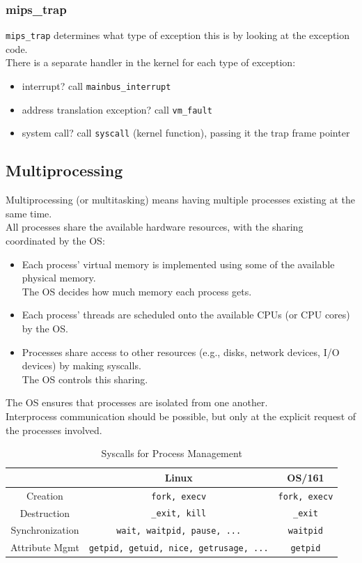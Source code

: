 \documentclass[12pt]{article}
\theoremstyle{plain}
\theoremstyle{definition}
\begin{document}
\subsubsection{mips\_trap}
\texttt{mips\_trap} determines what type of exception this is by looking at the exception code. \\
There is a separate handler in the kernel for each type of exception:
\begin{itemize}
  \item interrupt? call \texttt{mainbus\_interrupt}
  \item address translation exception? call \texttt{vm\_fault}
  \item system call? call \texttt{syscall} (kernel function), passing it the trap frame pointer
\end{itemize}

\subsection{Multiprocessing}
Multiprocessing (or multitasking) means having multiple processes existing at the same time. \\

All processes share the available hardware resources, with the sharing coordinated by the OS:
\begin{itemize}
  \item Each process' virtual memory is implemented using some of the available physical memory. \\
  The OS decides how much memory each process gets.
  \item Each process' threads are scheduled onto the available CPUs (or CPU cores) by the OS.
  \item Processes share access to other resources (e.g., disks, network devices, I/O devices) by making syscalls. \\
  The OS controls this sharing.
\end{itemize}

The OS ensures that processes are isolated from one another. \\
Interprocess communication should be possible, but only at the explicit request of the processes involved.

\begin{table}[h]
  \caption{Syscalls for Process Management}
  \label{tab:syscall_pmanage}
  \centering

  \begin{tabular}{|c||c|c|}
  \hline
  & Linux & OS/161 \\ \hline
  Creation & \texttt{fork, execv} & \texttt{fork, execv} \\ \hline
  Destruction & \texttt{\_exit, kill} & \texttt{\_exit} \\ \hline
  Synchronization & \texttt{wait, waitpid, pause, ...} & \texttt{waitpid} \\ \hline
  Attribute Mgmt & \texttt{getpid, getuid, nice, getrusage, ...} & \texttt{getpid} \\ \hline
  \end{tabular}
\end{table}
\end{document}
